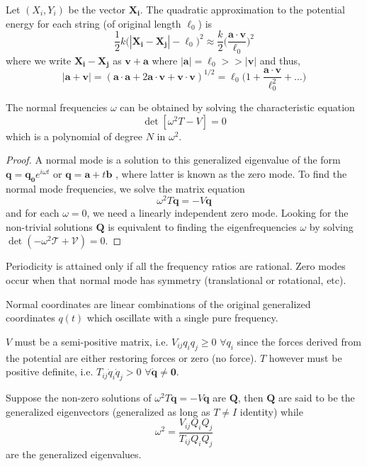 \documentclass[a4paper]{article}
\begin{document}
\begin{remarks}
 Let $(X_i,Y_i)$ be the vector $\mathbf{X_i}$. The quadratic approximation to the potential energy for each string (of original length $\ell_0$) is
$$\frac{1}{2}k\bigg(|\mathbf{X_i}-\mathbf{X_j}|-\ell_0\bigg)^2\approx\frac{k}{2}\bigg(\frac{\mathbf{a}\cdot\mathbf{v}}{\ell_0}\bigg)^2$$
where we write $\mathbf{X_i}-\mathbf{X_j}$ as $\mathbf{v}+\mathbf{a}$ where $|\mathbf{a}|=\ell_0>>|\mathbf{v}|$ and thus, 
$$|\mathbf{a}+\mathbf{v}|=(\mathbf{a}\cdot\mathbf{a}+2\mathbf{a}\cdot\mathbf{v}+\mathbf{v}\cdot\mathbf{v})^{1/2}=\ell_0\bigg(1+\frac{\mathbf{a}\cdot\mathbf{v}}{\ell_0^2}+\dots\bigg)$$
\end{remarks}
\begin{cor}
The normal frequencies $\omega$ can be obtained by solving the characteristic equation
$$\det[\omega^2T-V]=0$$
which is a polynomial of degree $N$ in $\omega^2$.
\end{cor}
\begin{proof}
A normal mode is a solution to this generalized eigenvalue of the form $\mathbf{q}=\mathbf{q_0}e^{i\omega t}$ or $\mathbf{q}=\mathbf{a}+t\mathbf{b}$
, where latter is known as the zero mode. To find the normal mode frequencies, we solve the matrix equation
$$\omega^2T\mathbf{q}=-V\mathbf{q}$$
and for each $\omega=0$, we need a linearly independent zero mode. Looking for the non-trivial solutions $\mathbf{Q}$ is equivalent to finding the eigenfrequencies $\omega$ by solving $\det(-\omega^2\mathcal{T}+\mathcal{V})=0$.
\end{proof}
\begin{remarks}
Periodicity is attained only if all the frequency ratios are rational. Zero modes occur when that normal mode has symmetry (translational or rotational, etc).
\end{remarks}
\begin{defi}
Normal coordinates are linear combinations of the original generalized coordinates $q(t)$ which oscillate with a single pure frequency.
\end{defi}
\begin{remarks}
$V$ must be a semi-positive matrix, i.e. $V_{ij}q_iq_j\geq0$ $\forall q_i$ since the forces derived from the potential are either restoring forces or zero (no force). $T$ however must be positive definite, i.e. $T_{ij}\dot{q}_i\dot{q}_j>0$ $\forall\mathbf{\dot{q}}\neq\boldsymbol{0}$.
\end{remarks}
\begin{defi}
Suppose the non-zero solutions of $\omega^2T\mathbf{q}=-V\mathbf{q}$ are $\mathbf{Q}$, then $\mathbf{Q}$ are said to be the generalized eigenvectors (generalized as long as $T\neq I$ identity) while 
$$\omega^2=\frac{V_{ij}Q_iQ_j}{T_{ij}Q_iQ_j}$$
are the generalized eigenvalues.
\end{defi}
\end{document}
